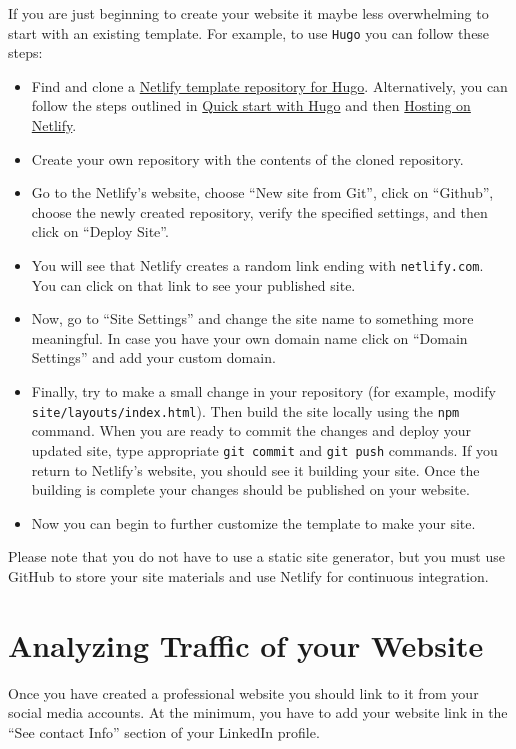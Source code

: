 \documentclass[11pt]{article}
\begin{document}
If you are just beginning to create your website it maybe less overwhelming to start with an existing template. For example, to use {\tt Hugo} you can follow these steps:
\begin{itemize}
	\item Find and clone a \href{https://github.com/netlify-templates/victor-hugo}{Netlify template repository for Hugo}. Alternatively, you can follow the steps outlined in \href{https://gohugo.io/getting-started/quick-start/}{Quick start with Hugo} and then \href{https://gohugo.io/hosting-and-deployment/hosting-on-netlify/}{Hosting on Netlify}.
	\item Create your own repository with the contents of the cloned repository. 
	\item Go to the Netlify's website, choose ``New site from Git'', click on ``Github'', choose the newly created repository, verify the specified settings, and then click on ``Deploy Site''.
	\item You will see that Netlify creates a random link ending with {\tt netlify.com}. You can click on that link to see your published site.
	\item Now, go to ``Site Settings'' and change the site name to something more meaningful. In case you have your own domain name click on ``Domain Settings'' and add your custom domain.
	\item Finally, try to make a small change in your repository (for example, modify {\tt site/layouts/index.html}). Then build the site locally using the {\tt npm} command. When you are ready to commit the changes and deploy your updated site, type appropriate {\tt git commit} and {\tt git push} commands. If you return to Netlify's website, you should see it building your site. Once the building is complete your changes should be published on your website.
	\item Now you can begin to further customize the template to make your site.
\end{itemize}

Please note that you do not have to use a static site generator, but you must use GitHub to store your site materials and use Netlify for continuous integration.

\vspace{-0.05in}
\section*{Analyzing Traffic of your Website}
Once you have created a professional website you should link to it from your social media accounts. At the minimum, you have to add your website link in the ``See contact Info'' section of your LinkedIn profile.
\end{document}
